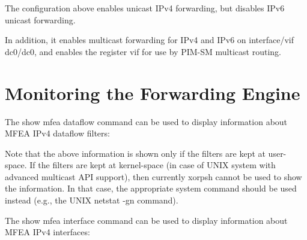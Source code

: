 \vspace{0.1in}
The configuration above enables unicast IPv4 forwarding, but disables
IPv6 unicast forwarding.

In addition, it enables multicast forwarding for IPv4 and IPv6 on
interface/vif {\stt dc0/dc0}, and enables the register vif for use by
PIM-SM multicast routing.

\section{Monitoring the Forwarding Engine}

The {\stt show mfea dataflow} command can be used to display
information about MFEA IPv4 dataflow filters:

\vspace{0.1in}
\noindent{}
\vspace{0.1in}

Note that the above information is shown only if the filters are kept at
user-space. If the filters are kept at kernel-space (\eg in case of UNIX
system with advanced multicast API support), then currently xorpsh
cannot be used to show the information. In that case, the appropriate system
command should be used instead (e.g., the UNIX {\stt netstat -gn} command).

The {\stt show mfea interface} command can be used to display
information about MFEA IPv4 interfaces:

